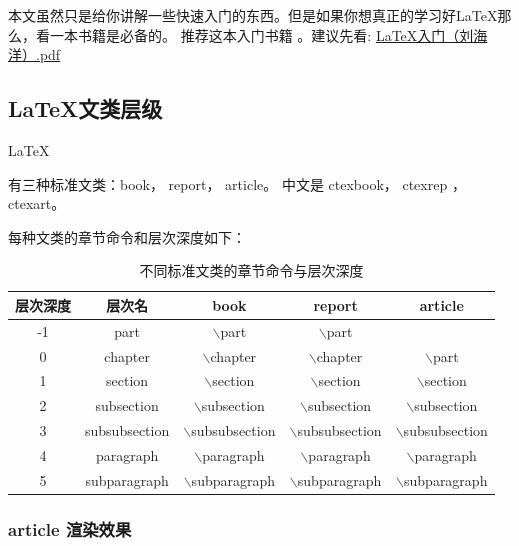 \documentclass[UTF8,AutoFakeBold]{ctexart}
\numberwithin{figure}{section}
\numberwithin{table}{section}
\begin{document}
本文虽然只是给你讲解一些快速入门的东西。但是如果你想真正的学习好\LaTeX 那么，看一本书籍是必备的。
推荐这本入门书籍\cite{latex_start} 。建议先看: \href{https://github.com/heartacker/MyNotes/blob/master/01.Latex/LaTeX_Docs_2014/04%20%E7%94%B5%E5%AD%90%E4%B9%A6/LaTeX%E5%85%A5%E9%97%A8%EF%BC%88%E5%88%98%E6%B5%B7%E6%B4%8B%EF%BC%89.pdf}{LaTeX入门（刘海洋）.pdf}


\subsection{\LaTeX 文类层级}
\label{sec:structure}
\hypertarget{Levelofdepth}{\LaTeX} 有三种标准文类：book， report， article。 中文是 ctexbook， ctexrep ， ctexart。

每种文类的章节命令和层次深度如下：


\begin{table}[htbp]
    \centering
    \begin{tabular}{|c|c|c|c|c|}
        \hline
        层次深度 & 层次名        & book                      & report                    & article                   \\
        \hline
        -1       & part          & $\backslash$part          & $\backslash$part          &                           \\
        0        & chapter       & $\backslash$chapter       & $\backslash$chapter       & $\backslash$part          \\
        1        & section       & $\backslash$section       & $\backslash$section       & $\backslash$section       \\
        2        & subsection    & $\backslash$subsection    & $\backslash$subsection    & $\backslash$subsection    \\
        3        & subsubsection & $\backslash$subsubsection & $\backslash$subsubsection & $\backslash$subsubsection \\
        4        & paragraph     & $\backslash$paragraph     & $\backslash$paragraph     & $\backslash$paragraph     \\
        5        & subparagraph  & $\backslash$subparagraph  & $\backslash$subparagraph  & $\backslash$subparagraph  \\
        \hline
    \end{tabular}
    \caption{不同标准文类的章节命令与层次深度}
    \label{tab:typeoflatex}
\end{table}


\subsubsection{article 渲染效果}
\end{document}
